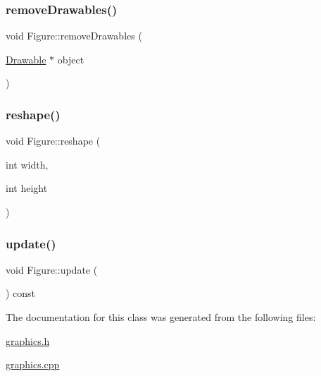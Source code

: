 \subsubsection{\texorpdfstring{remove\+Drawables()}{removeDrawables()}}
{\footnotesize\ttfamily void Figure\+::remove\+Drawables (\begin{DoxyParamCaption}\item[{\hyperlink{classDrawable}{Drawable} $\ast$}]{object }\end{DoxyParamCaption})}

\mbox{\label{classFigure_a876db9bf0c44bcdcdac91f7d040d5f71}} 
\subsubsection{\texorpdfstring{reshape()}{reshape()}}
{\footnotesize\ttfamily void Figure\+::reshape (\begin{DoxyParamCaption}\item[{int}]{width,  }\item[{int}]{height }\end{DoxyParamCaption})}

\mbox{\label{classFigure_ac78a5c4997e27f48b40a2d86a4b92b9c}} 
\subsubsection{\texorpdfstring{update()}{update()}}
{\footnotesize\ttfamily void Figure\+::update (\begin{DoxyParamCaption}{ }\end{DoxyParamCaption}) const}



The documentation for this class was generated from the following files\+:\begin{DoxyCompactItemize}
\item 
\hyperlink{graphics_8h}{graphics.\+h}\item 
\hyperlink{graphics_8cpp}{graphics.\+cpp}\end{DoxyCompactItemize}
